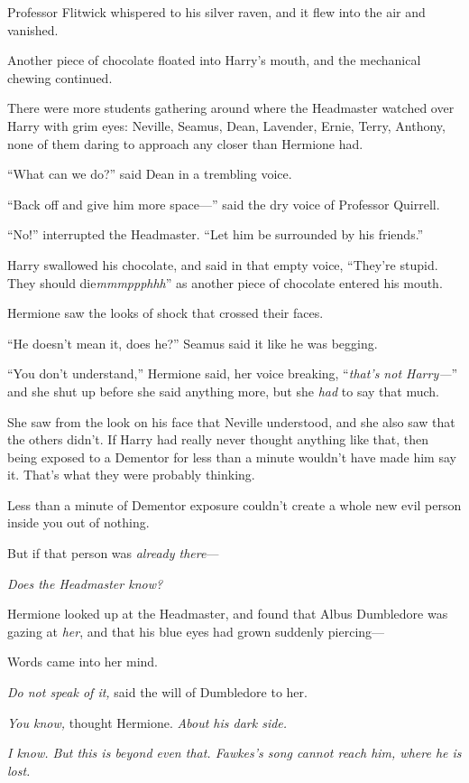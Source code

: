 Professor Flitwick whispered to his silver raven, and it flew into the air and vanished.

Another piece of chocolate floated into Harry’s mouth, and the mechanical chewing continued.

There were more students gathering around where the Headmaster watched over Harry with grim eyes: Neville, Seamus, Dean, Lavender, Ernie, Terry, Anthony, none of them daring to approach any closer than Hermione had.

“What can we do?” said Dean in a trembling voice.

“Back off and give him more space—” said the dry voice of Professor Quirrell.

“No!” interrupted the Headmaster. “Let him be surrounded by his friends.”

Harry swallowed his chocolate, and said in that empty voice, “They’re stupid. They should die\emph{mmmppphhh}” as another piece of chocolate entered his mouth.

Hermione saw the looks of shock that crossed their faces.

“He doesn’t mean it, does he?” Seamus said it like he was begging.

“You don’t understand,” Hermione said, her voice breaking, “\emph{that’s not Harry—}” and she shut up before she said anything more, but she \emph{had} to say that much.

She saw from the look on his face that Neville understood, and she also saw that the others didn’t. If Harry had really never thought anything like that, then being exposed to a Dementor for less than a minute wouldn’t have made him say it. That’s what they were probably thinking.

Less than a minute of Dementor exposure couldn’t create a whole new evil person inside you out of nothing.

But if that person was \emph{already there}—

\emph{Does the Headmaster know?}

Hermione looked up at the Headmaster, and found that Albus Dumbledore was gazing at \emph{her}, and that his blue eyes had grown suddenly piercing—

Words came into her mind.

\emph{Do not speak of it,} said the will of Dumbledore to her.

\emph{You know,} thought Hermione. \emph{About his dark side.}

\emph{I know. But this is beyond even that. Fawkes’s song cannot reach him, where he is lost.}


